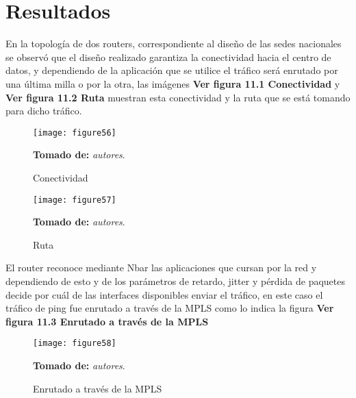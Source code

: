 \chapter{Resultados}
\label{cha:Resultados}

En la topología de dos routers, correspondiente al diseño de las sedes nacionales se observó que el diseño realizado garantiza la conectividad hacia el centro de datos, y dependiendo de la aplicación que se utilice el tráfico será enrutado por una última milla o por la otra, las imágenes  \textbf{Ver figura 11.1 Conectividad} y  \textbf{Ver figura 11.2  Ruta} muestran esta conectividad y la ruta que se está tomando para dicho tráfico. 

\begin{figure}[htbp]
  \centering
    {\texttt{[image: figure56]}}%
  \caption{ Conectividad}
  \textbf{Tomado de:} \textit{autores}.
  \label{fig:fig2subfig}
\end{figure}

\begin{figure}[htbp]
  \centering
    {\texttt{[image: figure57]}}%
  \caption{ Ruta}
  \textbf{Tomado de:} \textit{autores}.
  \label{fig:fig2subfig}
\end{figure}

El router reconoce mediante Nbar las aplicaciones que cursan por la red y dependiendo de esto y de los parámetros de retardo, jitter y pérdida de paquetes decide por cuál de las interfaces disponibles enviar el tráfico, en este caso el tráfico de ping fue enrutado a través de la MPLS como lo indica la figura \textbf{Ver figura 11.3 Enrutado a través de la MPLS}

\begin{figure}[htbp]
  \centering
    {\texttt{[image: figure58]}}%
  \caption{ Enrutado a través de la MPLS}
  \textbf{Tomado de:} \textit{autores}.
  \label{fig:fig2subfig}
\end{figure}

